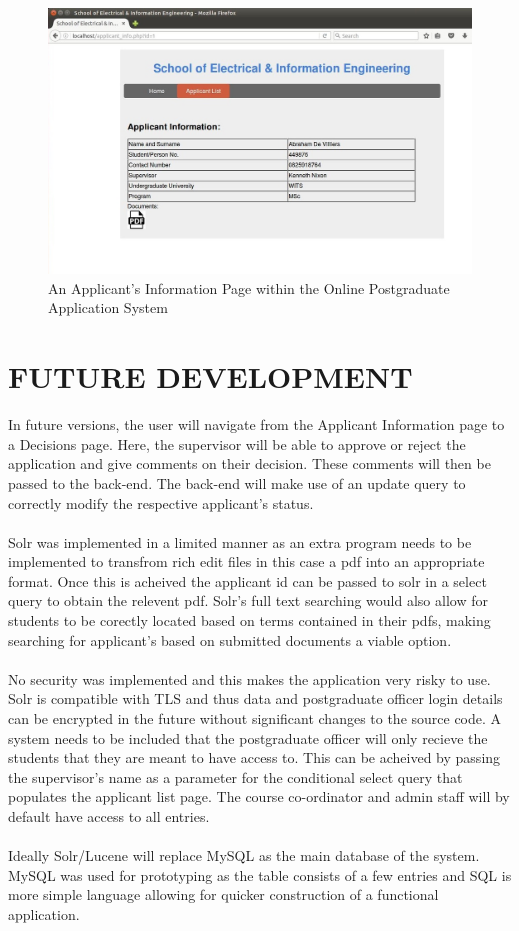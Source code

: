 \documentclass[journal,comsoc,onecolumn]{IEEEtran}
\begin{document}
\begin{figure}[h]
	\centering
	\includegraphics[width=0.7\linewidth]{information}
	\caption{An Applicant's Information Page within the Online Postgraduate Application System}
	\label{fig:information}
\end{figure}


\section{FUTURE DEVELOPMENT}
In future versions, the user will navigate from the Applicant Information page to a Decisions page. Here, the supervisor will be able to approve or reject the application and give comments on their decision. These comments will then be passed to the back-end. The back-end will make use of an update query to correctly modify the respective applicant's status. \\\\
Solr was implemented in a limited manner as an extra program needs to be implemented to transfrom rich edit files in this case a pdf into an appropriate format. Once this is acheived the applicant id can be passed to solr in a select query to obtain the relevent pdf. Solr's full text searching would also allow for students to be corectly located based on terms contained in their pdfs, making searching for applicant's based on submitted documents a viable option.\\\\
No security was implemented and this makes the application very risky to use. Solr is compatible with TLS and thus data and postgraduate officer login details can be encrypted in the future without significant changes to the source code. A system needs to be included that the postgraduate officer will only recieve the students that they are meant to have access to. This can be acheived by passing the supervisor's name as a parameter for the conditional select query that populates the applicant list page. The course co-ordinator and admin staff will by default have access to all entries.\\\\
Ideally Solr/Lucene will replace MySQL as the main database of the system. MySQL was used for prototyping as the table consists of a few entries and SQL is more simple language allowing for quicker construction of a functional application.
 
	
	
\end{document}
